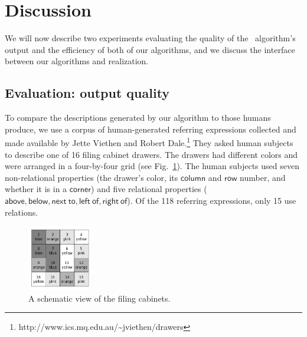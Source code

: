 \section{Discussion} \label{sec:discussion}

We will now describe two experiments evaluating the quality of the \el\
algorithm's output and the efficiency of both of our algorithms, and
we discuss the interface between our algorithms and realization.





\subsection{Evaluation: output quality}

To compare the descriptions generated by our algorithm to those humans
produce, we use a corpus of human-generated referring expressions
collected and made available by Jette Viethen and Robert
Dale.\footnote{http://www.ics.mq.edu.au/\~{}jviethen/drawers}  They
asked human subjects to describe one of 16 filing cabinet drawers. The
drawers had different colors and were arranged in a four-by-four grid
(see Fig.~\ref{fig:drawers}). The human subjects used seven
non-relational properties (the drawer's color, its $\mathsf{column}$
and $\mathsf{row}$ number, and whether it is in a $\mathsf{corner}$)
and five relational properties ($\mathsf{above, below, next\ to, left\
  of, right\ of}$). Of the 118 referring expressions, only 15 use
relations.

\begin{figure}
\begin{center}
\includegraphics[width=0.25\textwidth]{drawers.png}
\end{center}\vspace*{-3ex}
\caption{A schematic view of the filing cabinets.}\label{fig:drawers}\vspace*{-3ex}
\end{figure}


